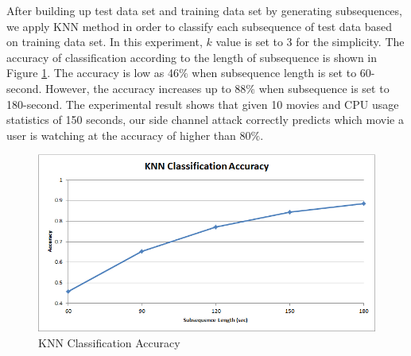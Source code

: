 After building up test data set and training data set by generating subsequences, we apply KNN method in order to classify each subsequence of test data based on training data set. 
In this experiment, $k$ value is set to 3 for the simplicity.
The accuracy of classification according to the length of subsequence is shown in Figure \ref{fig:experiment_knn}.
The accuracy is low as 46$\%$ when subsequence length is set to 60-second.
However, the accuracy increases up to 88$\%$ when subsequence is set to 180-second.
The experimental result shows that given 10 movies and CPU usage statistics of 150 seconds, our side channel attack correctly predicts which movie a user is watching at the accuracy of higher than 80$\%$.

\begin{figure}[!h]
\centering
\includegraphics[scale=0.50]{Figures/experiment_knn}
\caption{KNN Classification Accuracy}
\label{fig:experiment_knn}
\vspace{-5mm}
\end{figure}